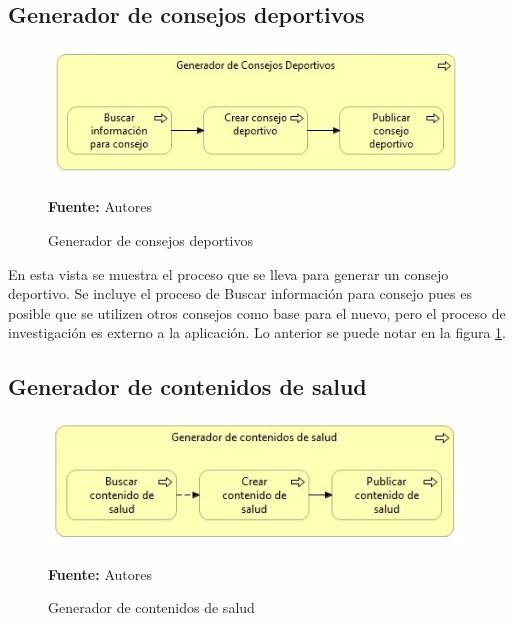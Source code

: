 \subsection{Generador de consejos deportivos}

\begin{figure}[!htb]
  \begin{center}
    \includegraphics[width=11cm]{./imagenes/Archimate/vistas/business_process/generadorconsejosdeportivos.png}
    \caption{Generador de consejos deportivos}
    \label{fig:BP_GeneradorConsejosDeportivos}
    \textbf{Fuente:}  Autores \\
  \end{center}
\end{figure}

En esta vista se muestra el proceso que se lleva para generar un consejo deportivo. Se incluye el proceso de Buscar información para consejo pues es posible que se utilizen otros consejos como base para el nuevo, pero el proceso de investigación es externo a la aplicación. Lo anterior se puede notar en la figura \ref{fig:BP_GeneradorConsejosDeportivos}.

\subsection{Generador de contenidos de salud}

\begin{figure}[!htb]
  \begin{center}
    \includegraphics[width=11cm]{./imagenes/Archimate/vistas/business_process/generadorcontenidossalud.png}
    \caption{Generador de contenidos de salud}
    \label{fig:BP_GeneradorContenidosSalud}
    \textbf{Fuente:} Autores \\
  \end{center}
\end{figure}

